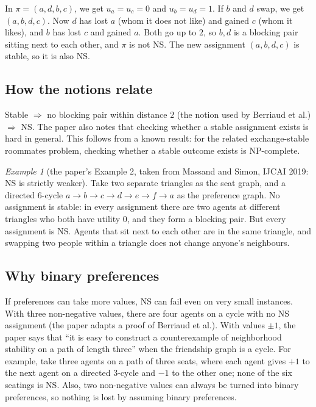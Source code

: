 \documentclass[11pt,a4paper]{article}
\theoremstyle{definition}
\theoremstyle{remark}
\newtheorem*{paperexample}{Example}
\theoremstyle{plain}
\begin{document}
In $\pi=(a,d,b,c)$, we get $u_a=u_c=0$ and $u_b=u_d=1$. If $b$ and $d$ swap, we get $(a,b,d,c)$. Now $d$ has lost $a$ (whom it does not like) and gained $c$ (whom it likes), and $b$ has lost $c$ and gained $a$. Both go up to $2$, so $b,d$ is a blocking pair sitting next to each other, and $\pi$ is not NS. The new assignment $(a,b,d,c)$ is stable, so it is also NS.

\subsection{How the notions relate}

Stable $\Rightarrow$ no blocking pair within distance $2$ (the notion used by Berriaud et al.) $\Rightarrow$ NS. The paper also notes that checking whether a stable assignment exists is hard in general. This follows from a known result: for the related exchange-stable roommates problem, checking whether a stable outcome exists is NP-complete.

\begin{paperexample}[the paper's Example 2, taken from Massand and Simon, IJCAI 2019: NS is strictly weaker]
Take two separate triangles as the seat graph, and a directed $6$-cycle $a\to b\to c\to d\to e\to f\to a$ as the preference graph. No assignment is stable: in every assignment there are two agents at different triangles who both have utility $0$, and they form a blocking pair. But every assignment is NS. Agents that sit next to each other are in the same triangle, and swapping two people within a triangle does not change anyone's neighbours.
\end{paperexample}

\subsection{Why binary preferences}
If preferences can take more values, NS can fail even on very small instances. With three non-negative values, there are four agents on a cycle with no NS assignment (the paper adapts a proof of Berriaud et al.). With values $\pm1$, the paper says that ``it is easy to construct a counterexample of neighborhood stability on a path of length three'' when the friendship graph is a cycle. For example, take three agents on a path of three seats, where each agent gives $+1$ to the next agent on a directed $3$-cycle and $-1$ to the other one; none of the six seatings is NS. Also, two non-negative values can always be turned into binary preferences, so nothing is lost by assuming binary preferences.
\end{document}
